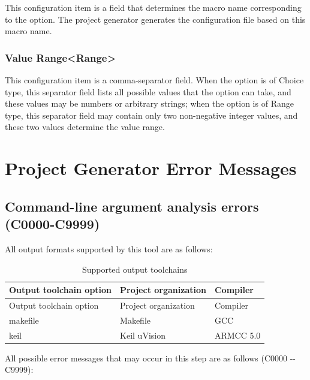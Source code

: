 This configuration item is a field that determines the macro name corresponding to the option. The project generator generates the configuration file based on this macro name.

\subsubsection{Value Range<Range>{}}\label{subsubsec:5-5-13-4}

This configuration item is a comma-separator field. When the option is of Choice type, this separator field lists all possible values that the option can take, and these values may be numbers or arbitrary strings; when the option is of Range type, this separator field may contain only two non-negative integer values, and these two values determine the value range.


\section{Project Generator Error Messages}\label{sec:5-6}

\subsection{Command-line argument analysis errors (C0000-C9999)}\label{subsec:5-6-1}

All output formats supported by this tool are as follows:

\begin{xltabular}{\textwidth}{@{}>{\hsize\raggedright\arraybackslash}X>{\hsize\raggedright\arraybackslash}X>{\hsize\raggedright\arraybackslash}X@{}}
\caption{Supported output toolchains}\label{tab:5-1}\\
\toprule
Output toolchain option & Project organization & Compiler\tabularnewline
\endfirsthead
\toprule
Output toolchain option & Project organization & Compiler\tabularnewline
\midrule
\endhead
\bottomrule
\endlastfoot
makefile & Makefile & GCC\tabularnewline
keil & Keil uVision & ARMCC 5.0\tabularnewline
\end{xltabular}

All possible error messages that may occur in this step are as follows (C0000 -\/- C9999):

